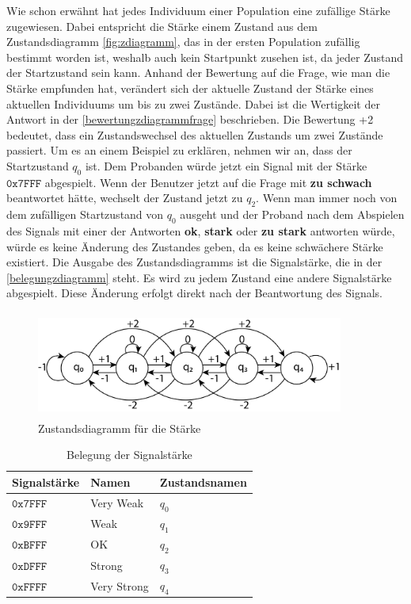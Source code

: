 Wie schon erw{\"a}hnt hat jedes Individuum einer Population eine zuf{\"a}llige St{\"a}rke zugewiesen.
Dabei entspricht die St{\"a}rke einem Zustand aus dem Zustandsdiagramm \autoref{fig:zdiagramm}, das in der ersten Population zuf{\"a}llig bestimmt worden ist, weshalb auch kein Startpunkt zusehen ist, da jeder Zustand der Startzustand sein kann. Anhand der Bewertung auf die Frage, wie man die St{\"a}rke empfunden hat, ver{\"a}ndert sich der aktuelle Zustand der St{\"a}rke eines aktuellen Individuums um bis zu zwei Zust{\"a}nde. Dabei ist die Wertigkeit der Antwort in der \autoref{bewertungzdiagrammfrage} beschrieben. 
Die Bewertung +2 bedeutet, dass ein Zustandswechsel des aktuellen Zustands um zwei Zust{\"a}nde passiert. 
Um es an einem Beispiel zu erkl{\"a}ren, nehmen wir an, dass der Startzustand $q_{0}$ ist. Dem Probanden w{\"u}rde jetzt ein Signal mit der St{\"a}rke $\mathtt{0x7FFF}$ abgespielt. Wenn der Benutzer jetzt auf die Frage mit \textbf{zu schwach} beantwortet h{\"a}tte, wechselt der Zustand jetzt zu $q_{2}$. Wenn man immer noch von dem zuf{\"a}lligen Startzustand von $q_{0}$ ausgeht und der Proband nach dem Abspielen des Signals mit einer der Antworten \textbf{ok}, \textbf{stark} oder \textbf{zu stark} antworten w{\"u}rde, w{\"u}rde es keine {\"A}nderung des Zustandes geben, da es keine schw{\"a}chere St{\"a}rke existiert. Die Ausgabe des Zustandsdiagramms ist die Signalst{\"a}rke, die in der \autoref{belegungzdiagramm} steht. Es wird zu jedem Zustand eine andere Signalst{\"a}rke abgespielt. Diese {\"A}nderung erfolgt direkt nach der Beantwortung des Signals. 

\begin{figure}
	\centering
    \includegraphics[width=0.9\textwidth,height=3.5cm]{pics/entwurf/zdiagramm3.png}
    \caption{Zustandsdiagramm f{\"u}r die St{\"a}rke}
    \label{fig:zdiagramm}
\end{figure}

\begin{table}[]
\centering
\caption{Belegung der Signalst{\"a}rke}
\label{belegungzdiagramm}
\begin{tabular}{l|l|l}
  Signalst{\"a}rke  & Namen       & Zustandsnamen \\ \hline
  $\mathtt{0x7FFF}$ & Very Weak   & $q_{0}$       \\ \hline
  $\mathtt{0x9FFF}$ & Weak        & $q_{1}$       \\ \hline
  $\mathtt{0xBFFF}$ & OK          & $q_{2}$       \\ \hline
  $\mathtt{0xDFFF}$ & Strong      & $q_{3}$       \\ \hline
  $\mathtt{0xFFFF}$ & Very Strong & $q_{4}$       \\
\end{tabular}
\end{table}

